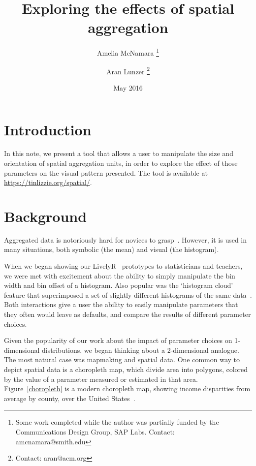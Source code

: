 \documentclass{article}\usepackage[]{graphicx}\usepackage[]{color}
\begin{document}
\title{Exploring the effects of spatial aggregation}
\author[1]{Amelia McNamara%
\thanks{Some work completed while the author was partially funded by the Communications Design Group, SAP Labs. Contact: amcnamara@smith.edu}}
\author[2]{Aran Lunzer%
\thanks{Contact: aran@acm.org}}
\date{May 2016}

\maketitle

\section{Introduction}
In this note, we present a tool that allows a user to manipulate the size and orientation of spatial aggregation units, in order to explore the effect of those parameters on the visual pattern presented. The tool is available at \\ \url{https://tinlizzie.org/spatial/}. 

\section{Background}
Aggregated data is notoriously hard for novices to grasp~\citep{KonHigRus2014, HanKap1992}. However, it is used in many situations, both symbolic (the mean) and visual (the histogram). 

When we began showing our LivelyR~\citep{LunMcN2014b} prototypes to statisticians and teachers, we were met with excitement about the ability to simply manipulate the bin width and bin offset of a histogram. Also popular was the `histogram cloud' feature that superimposed a set of slightly different histograms of the same data~\citep{McN2015}. Both interactions give a user the ability to easily manipulate parameters that they often would leave as defaults, and compare the results of different parameter choices. 

Given the popularity of our work about the impact of parameter choices on 1-dimensional distributions, we began thinking about a 2-dimensional analogue. The most natural case was mapmaking and spatial data. One common way to depict spatial data is a choropleth map, which divide area into polygons, colored by the value of a parameter measured or estimated in that area. Figure~\ref{choropleth} is a modern choropleth map, showing income disparities from average by county, over the United States~\citep{AisBut2015}. 
\end{document}
